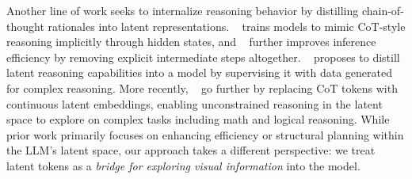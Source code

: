 Another line of work seeks to internalize reasoning behavior by distilling chain-of-thought rationales into latent representations. ~\cite{deng2023implicit} trains models to mimic CoT-style reasoning implicitly through hidden states, and ~\citep{deng2024explicit} further improves inference efficiency by removing explicit intermediate steps altogether. ~\cite{yu2024distilling} proposes to distill latent reasoning capabilities into a model by supervising it with data generated for complex reasoning. More recently, ~\cite{hao2024training} go further by replacing CoT tokens with continuous latent embeddings, enabling unconstrained reasoning in the latent space to explore on complex tasks including math and logical reasoning.
While prior work primarily focuses on enhancing efficiency or structural planning within the LLM's latent space, our approach takes a different perspective: we treat latent tokens as a \emph{bridge for exploring visual information} into the model.

